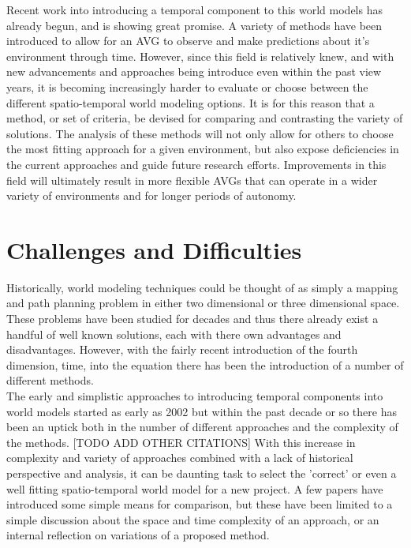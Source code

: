   Recent work into introducing a temporal component to this world models has
  already begun, and is showing great promise. A variety of methods have been
  introduced to allow for an AVG to observe and make predictions about it's
  environment through time. However, since this field is relatively knew, and
  with new advancements and approaches being introduce even within the past view
  years, it is becoming increasingly harder to evaluate or choose between the
  different spatio-temporal world modeling options. It is for this reason that a
  method, or set of criteria, be devised for comparing and contrasting the
  variety of solutions. The analysis of these methods will not only allow for
  others to choose the most fitting approach for a given environment, but also
  expose deficiencies in the current approaches and guide future research
  efforts.  Improvements in this field will ultimately result in more flexible
  AVGs that can operate in a wider variety of environments and for longer
  periods of autonomy.

  \section{ Challenges and Difficulties }

  Historically, world modeling techniques could be thought of as simply a mapping
  and path planning problem in either two dimensional or three dimensional space.
  These problems have been studied for decades and thus there already exist a
  handful of well known solutions, each with there own advantages and
  disadvantages. However, with the fairly recent introduction of the fourth
  dimension, time, into the equation there has been the introduction of a number
  of different methods. \\

  The early and simplistic approaches to introducing temporal components into
  world models started as early as 2002 \cite{Arbuckle2002} but within the past
  decade or so there has been an uptick both in the number of different
  approaches and the complexity of the methods. \cite{Krajnik2017} [TODO ADD
  OTHER CITATIONS] With this increase in complexity and variety of approaches
  combined with a lack of historical perspective and analysis, it can be
  daunting task to select the 'correct' or even a well fitting spatio-temporal
  world model for a new project. A few papers have introduced some simple means
  for comparison, but these have been limited to a simple discussion about the
  space and time complexity of an approach, or an internal reflection on
  variations of a proposed method.


